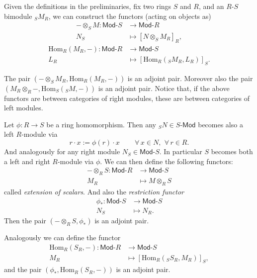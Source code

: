 \begin{rem}[]
	Given the definitions in the preliminaries, fix two rings $S$ and $R$, and an $R$-$S$ bimodule ${}_SM_R$,
	we can construct the functors (acting on objects as)
	\begin{align}
		- \otimes_S M: \mathsf{Mod}\text{-}S &\to \mathsf{Mod}\text{-}R \\
		 N_S &\mapsto \left[ N \otimes_S M_R \right]_R
	,\end{align}
	\begin{align}
		\mathrm{Hom}_{R} \left( M_R, - \right): \mathsf{Mod}\text{-}R &\to \mathsf{Mod}\text{-}S \\
		L_R &\mapsto \left[ \mathrm{Hom}_{R}\left( {}_SM_R, L_R \right)\right]_S
	.\end{align} 	
\end{rem}

\begin{prop}
	The pair $\left(- \otimes_S M_R, \mathrm{Hom}_{R}\left( M_R, - \right)\right)$
	is an adjoint pair.
	Moreover also the pair $\left(M_R \otimes_R -, 
	\mathrm{Hom}_{S}\left( {}_SM, - \right) \right)$ is an adjoint pair.
	Notice that, if the above functors are between categories of right modules,
	these are between categories of left modules.
\end{prop} 

\begin{ex}
	Let $\phi: R \to S$ be a ring homomorphism.
	Then any ${}_SN \in S\text{-}\mathsf{Mod}$ becomes also a left $R$-module via
	\begin{equation}
		r \cdot x := \phi(r) \cdot x \qquad \,\forall\, x \in N,\ \,\forall\, r \in R
	.\end{equation} 
	And analogously for any right module $N_S \in \mathsf{Mod}\text{-}S$.
	In particular $S$ becomes both a left and right $R$-module via $\phi$.
	We can then define the following functors:
	\begin{align}
		-\otimes_R S: \mathsf{Mod}\text{-}R &\to \mathsf{Mod}\text{-}S \\
		M_R &\mapsto M \otimes_R S
	\end{align} 
	called \textit{extension of scalars}.
	And also the \textit{restriction functor}
	\begin{align}
		\phi_*: \mathsf{Mod}\text{-}S &\to \mathsf{Mod}\text{-}S \\
		N_S &\mapsto N_R
	.\end{align} 
	Then the pair $\left(- \otimes_R S, \phi_*\right)$ is an adjoint pair.

	Analogously we can define the functor
	\begin{align}
		\mathrm{Hom}_{ R}\left( S_R, - \right): \mathsf{Mod}\text{-}R &\to \mathsf{Mod}\text{-}S\\
		M_R &\mapsto \left[ \mathrm{Hom}_{R}\left({}_SS_R, M_R \right) \right]_S
	,\end{align} 
	and the pair $\left(\phi_*, \mathrm{Hom}_{ R}\left( S_R, - \right)\right)$ is an adjoint pair.
\end{ex} 	


